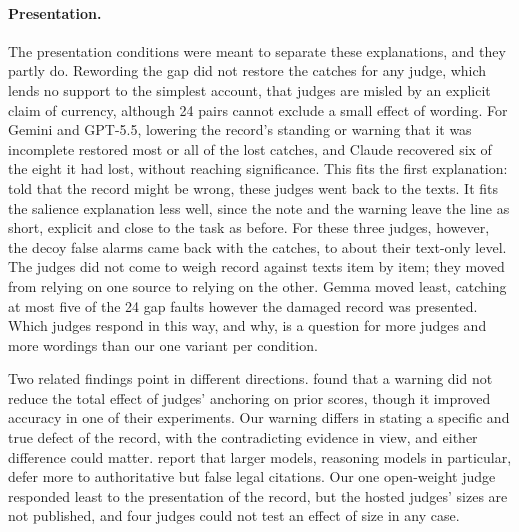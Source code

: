 \paragraph{Presentation.}
The presentation conditions were meant to separate these explanations, and they partly do. Rewording the gap did not
restore the catches for any judge, which lends no support to the simplest account, that judges are misled by an
explicit claim of currency, although 24 pairs cannot exclude a small effect of wording. For Gemini and GPT-5.5,
lowering the record's standing or warning that it was incomplete restored most or all of the lost catches, and Claude
recovered six of the eight it had lost, without reaching significance. This fits the first explanation: told that the
record might be wrong, these judges went back to the texts. It fits the salience explanation less well, since the note
and the warning leave the line as short, explicit and close to the task as before. For these three judges, however,
the decoy false alarms came back with the catches, to about their text-only level. The judges did not come to weigh
record against texts item by item; they moved from relying on one source to relying on the other. Gemma moved least,
catching at most five of the 24 gap faults however the damaged record was presented. Which judges respond in this way,
and why, is a question for more judges and more wordings than our one variant per condition.

Two related findings point in different directions. \citet{kapetanovic2026anchoring} found that a warning did not
reduce the total effect of judges' anchoring on prior scores, though it improved accuracy in one of their experiments.
Our warning differs in stating a specific and true defect of the record, with the contradicting evidence in view, and
either difference could matter. \citet{molfetta2026sycophants} report that larger models, reasoning models in particular, defer
more to authoritative but false legal citations. Our one open-weight judge responded least to the
presentation of the record, but the hosted judges' sizes are not published, and four judges could not test an effect
of size in any case.

